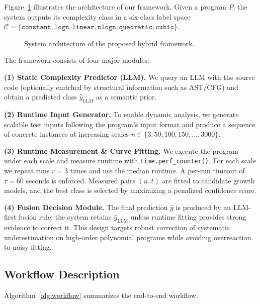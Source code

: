 \documentclass[conference]{IEEEtran}
\begin{document}
 Figure~\ref{fig:system_overview} illustrates the architecture of our framework. Given a program $P$, 
 the system outputs its complexity class in a six-class label space 
 $\mathcal{C}=\{\texttt{constant}, \texttt{logn}, \texttt{linear}, \texttt{nlogn}, \texttt{quadratic}, \texttt{cubic}\}$. 
 
 \begin{figure}[t] 
 \centering 
 \caption{System architecture of the proposed hybrid framework.} 
 \label{fig:system_overview} 
 \end{figure} 
 
 The framework consists of four major modules: 
 
 \textbf{(1) Static Complexity Predictor (LLM).} 
 We query an LLM with the source code (optionally enriched by structural information such as AST/CFG) 
 and obtain a predicted class $\hat{y}_{\text{LLM}}$ as a semantic prior. 
 
 \textbf{(2) Runtime Input Generator.} 
 To enable dynamic analysis, we generate scalable test inputs following the program's input format and 
 produce a sequence of concrete instances at increasing scales 
 $n \in \{3,50,100,150,\dots,3000\}$. 
 
 \textbf{(3) Runtime Measurement \& Curve Fitting.} 
 We execute the program under each scale and measure runtime with \texttt{time.perf\_counter()}. 
 For each scale we repeat runs $r=3$ times and use the median runtime. A per-run timeout of $\tau=60$ seconds is enforced. 
 Measured pairs $(n,t)$ are fitted to candidate growth models, and the best class is selected by maximizing a penalized 
 confidence score. 
 
 \textbf{(4) Fusion Decision Module.} 
 The final prediction $\hat{y}$ is produced by an LLM-first fusion rule: the system retains 
 $\hat{y}_{\text{LLM}}$ unless runtime fitting provides strong evidence to correct it. This design targets robust 
 correction of systematic underestimation on high-order polynomial programs while avoiding overreaction to noisy fitting. 
 
 \subsection{Workflow Description} 
 \label{subsec:workflow} 
 
 Algorithm~\ref{alg:workflow} summarizes the end-to-end workflow. 
 
\end{document}
